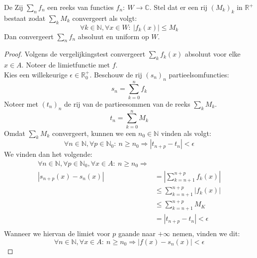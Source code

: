 \documentclass[main.tex]{subfiles}
\begin{document}
\begin{bst}
  De 
  Zij $\sum_{n}f_{n}$ een reeks van functies $f_{n}:\ W \rightarrow \mathbb{C}$.
  Stel dat er een rij $(M_{k})_{k}$ in $\mathbb{R}^{+}$ bestaat zodat $\sum_{k}M_{k}$ convergeert als volgt:
  \[ \forall k\in \mathbb{N}, \forall x \in W:\ |f_{k}(x)| \le M_{k} \]
  Dan convergeert $\sum_{n}f_{n}$ absoluut en uniform op $W$.

  \begin{proof}
    Volgens de vergelijkingstest convergeert $\sum_{k}f_{k}(x)$ absoluut voor elke $x\in A$.
    Noteer de limietfunctie met $f$.\\
    Kies een willekeurige $\epsilon \in \mathbb{R}_{0}^{+}$.
    Beschouw de rij $(s_{n})_{n}$ partieelsomfuncties:
    \[ s_{n} = \sum_{k=0}^{n}f_{k} \]
    Noteer met $(t_{n})_{n}$ de rij van de partieesommen van de reeks $\sum_{k}M_{k}$.
    \[ t_{n} = \sum_{k=0}^{n}M_{k} \]
    Omdat $\sum_{k}M_{k}$ convergeert, kunnen we een $n_{0}\in \mathbb{N}$ vinden als volgt:
    \[ \forall n \in \mathbb{N}, \forall p\in \mathbb{N}_{0}:\ n \ge n_{0} \Rightarrow |t_{n+p}-t_{n}| < \epsilon \]
    We vinden dan het volgende:
    \[
    \begin{array}{rl}
      \forall n\in \mathbb{N}, \forall p\in \mathbb{N}_{0}, \forall x\in A:\ n \ge n_{0} \Rightarrow\\
      |s_{n+p}(x) - s_{n}(x)|
      &= \left|\sum_{k=n+1}^{n+p}f_{k}(x)\right|\\
      &\le \sum_{k=n+1}^{n+p}|f_{k}(x)|\\
      &\le \sum_{k=n+1}^{n+p}M_{K}\\
      &=|t_{n+p}-t_{n}| < \epsilon\\
    \end{array}
    \]
    Wanneer we hiervan de limiet voor $p$ gaande naar $+\infty$ nemen, vinden we dit:
    \[ \forall n \in \mathbb{N}, \forall x\in A:\ n \ge n_{0} \Rightarrow |f(x)-s_{n}(x)| < \epsilon \]
  \end{proof}
\end{bst}
\end{document}
